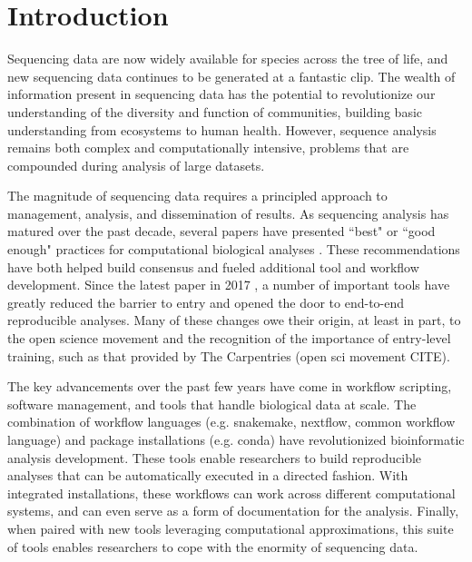 \documentclass[10pt,letterpaper]{article}
\begin{document}
\linenumbers

\section*{Introduction}

Sequencing data are now widely available for species across the tree of life, and new sequencing data continues to be generated at a fantastic clip. %
The wealth of information present in sequencing data has the potential to revolutionize our understanding of the diversity and function of communities, building basic understanding from ecosystems to human health.
However, sequence analysis remains both complex and computationally intensive, problems that are compounded during analysis of large datasets.

The magnitude of sequencing data requires a principled approach to management, analysis, and dissemination of results.
As sequencing analysis has matured over the past decade, several papers have presented ``best" or ``good enough" practices for computational biological analyses \cite{aruliah2012best, wilson2014best, shade2015roadmap, wilson2017good}.
These recommendations have both helped build consensus and fueled additional tool and workflow development.
Since the latest paper in 2017 \cite{wilson2017good}, a number of important tools have greatly reduced the barrier to entry and opened the door to end-to-end reproducible analyses. %
Many of these changes owe their origin, at least in part, to the open science movement and the recognition of the importance of entry-level training, such as that provided by The Carpentries \cite{teal2015data} (open sci movement CITE).

The key advancements over the past few years have come in workflow scripting, software management, and tools that handle biological data at scale. %
The combination of workflow languages (e.g. snakemake, nextflow, common workflow language) and package installations (e.g. conda) have revolutionized bioinformatic analysis development.
These tools enable researchers to build reproducible analyses that can be automatically executed in a directed fashion. 
With integrated installations, these workflows can work across different computational systems, and can even serve as a form of documentation for the analysis.
Finally, when paired with new tools leveraging computational approximations, this suite of tools enables researchers to cope with the enormity of sequencing data.
\end{document}
